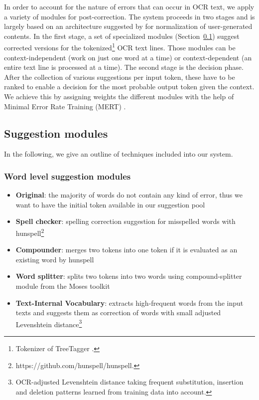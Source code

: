 \documentclass[11pt,letterpaper]{article}
\begin{document}
In order to account for the nature of errors that can occur in OCR text, we apply a variety of modules for post-correction.
The system proceeds in two stages and is largely based on an architecture suggested by  for normalization
of user-generated contents. In the first stage, a set of specialized modules (Section~\ref{sec:sugg}) suggest corrected versions for the tokenized\footnote{Tokenizer of TreeTagger \cite{Schmid1997}.} OCR text lines. Those modules can be context-independent (work on just one word at a time) or context-dependent (an entire text line is processed at a time). The second stage is the decision phase. After the collection of various suggestions per input token, these have to be ranked to enable a decision for the most probable output token given the context. We achieve this by assigning weights the different modules with the help of Minimal Error Rate Training (MERT) \cite{Och2003}. 


\subsection{Suggestion modules}\label{sec:sugg}

In the following, we give an outline of techniques included into our system.

\subsubsection{Word level suggestion modules}

\begin{itemize}
\setlength\itemsep{-0.5em}
   \item \textbf{Original}: the majority of words do not contain any kind of error, thus we want to have the initial token available in our suggestion pool
   \item \textbf{Spell checker}: spelling correction suggestion for misspelled words with hunspell\footnote{https://github.com/hunspell/hunspell.} 
   \item \textbf{Compounder}: merges two tokens into one token if it is evaluated as an existing word by hunspell
   \item \textbf{Word splitter}: splits two tokens into two words using compound-splitter module from the Moses toolkit \cite{Koehn2007}
   \item \textbf{Text-Internal Vocabulary}: extracts high-frequent words from the input texts and suggests them as correction of words with small adjusted Levenshtein distance\footnote{OCR-adjusted Levenshtein distance taking frequent substitution, insertion and deletion patterns learned from training data into account.}
\end{itemize}
\end{document}
